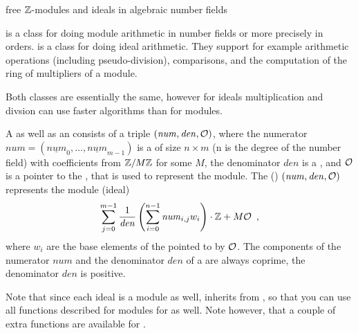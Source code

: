 
\newcommand{\num}{\mathit{num}}
\newcommand{\den}{\mathit{den}}



\NAME

 \dotfill free $\mathbb{Z}$-modules and ideals in
algebraic number fields



\ABSTRACT

 is a class for doing module arithmetic in number fields or more precisely in
orders.   is a class for doing ideal arithmetic.  They support for example
arithmetic operations (including pseudo-division), comparisons, and the computation of the ring
of multipliers of a module.

Both classes are essentially the same, however for ideals multiplication and divsion can use
faster algorithms than for modules.



\DESCRIPTION

A  as well as an  consists of a triple $(\num, \den, \Or)$, where
the numerator $\num = (\underline{\num}_0, \dots, \underline{\num}_{m-1})$ is a
 of size $n \times m$ (n is the degree of the number field) with
coefficients from $\mathbb{Z} / M \mathbb{Z}$ for some $M$, the denominator $\den$ is a , and
$\mathcal{O}$ is a pointer to the , that is used to represent the module.  The
() $(\num, \den, \Or)$ represents the module (ideal)
\begin{displaymath}
  \sum_{j=0}^{m-1} \frac{1}{\den} \left(\sum_{i=0}^{n-1} \num_{i,j} w_i\right) \cdot \bbfZ+M \Or
  \enspace,
\end{displaymath}
where $w_i$ are the base elements of the  pointed to by $\mathcal{O}$.  The components of
the numerator $\num$ and the denominator $\den$ of a  are always coprime, the
denominator $\den$ is positive.

Note that since each ideal is a module as well,  inherits from , so
that you can use all functions described for modules for  as well.  Note
however, that a couple of extra functions are available for .


